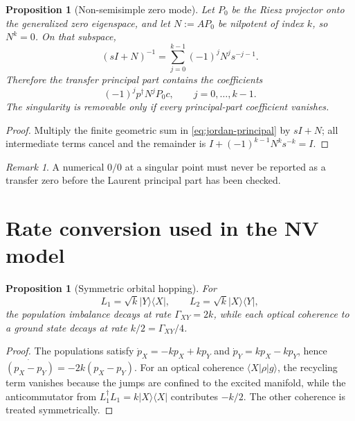 \documentclass[11pt,a4paper]{article}
\newtheorem{proposition}[theorem]{Proposition}
\theoremstyle{remark}
\newtheorem{remark}[theorem]{Remark}
\newcommand{\ket}[1]{|#1\rangle}
\newcommand{\bra}[1]{\langle #1|}
\begin{document}
\begin{proposition}[Non-semisimple zero mode]
Let $P_0$ be the Riesz projector onto the generalized zero eigenspace, and let
$N:=AP_0$ be nilpotent of index $k$, so $N^k=0$.  On that subspace,
\begin{equation}
(sI+N)^{-1}=\sum_{j=0}^{k-1}(-1)^jN^j s^{-j-1}.
\label{eq:jordan-principal}
\end{equation}
Therefore the transfer principal part contains the coefficients
\[
(-1)^j p^\dagger N^jP_0c,
\qquad j=0,\ldots,k-1.
\]
The singularity is removable only if every principal-part coefficient
vanishes.
\end{proposition}

\begin{proof}
Multiply the finite geometric sum in \eqref{eq:jordan-principal} by
$sI+N$; all intermediate terms cancel and the remainder is
$I+(-1)^{k-1}N^ks^{-k}=I$.
\end{proof}

\begin{remark}
A numerical $0/0$ at a singular point must never be reported as a transfer
zero before the Laurent principal part has been checked.
\end{remark}

\section{Rate conversion used in the NV model}

\begin{proposition}[Symmetric orbital hopping]
For
\[
L_1=\sqrt{k}\ket Y\bra X,
\qquad
L_2=\sqrt{k}\ket X\bra Y,
\]
the population imbalance decays at rate
$\Gamma_{XY}=2k$, while each optical coherence to a ground state decays at
rate $k/2=\Gamma_{XY}/4$.
\end{proposition}

\begin{proof}
The populations satisfy
$\dot p_X=-kp_X+kp_Y$ and $\dot p_Y=kp_X-kp_Y$, hence
$\dot{(p_X-p_Y)}=-2k(p_X-p_Y)$.  For an optical coherence $\bra X\rho\ket g$,
the recycling term vanishes because the jumps are confined to the excited
manifold, while the anticommutator from $L_1^\dagger L_1=k\ket X\bra X$
contributes $-k/2$.  The other coherence is treated symmetrically.
\end{proof}

\end{document}
